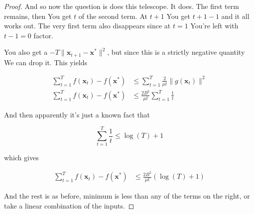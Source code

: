 \documentclass{article}
\begin{document}
\begin{proof}
			And so now the question is does this telescope. It does. The first term remains, then You get $t$ of the second term. At $t+1$ You get $t+1-1$ and it all works out. The very first term also disappears since at $t=1$ You're left with $t-1=0$ factor. 
			
			You also get a $-T\|\mathbf{x}_{t+1} - \mathbf{x}^* \|^2$, but since this is a strictly negative quantity We can drop it. This yields 
			
			\begin{align*}
				\sum ^T_{t=1} f(\mathbf{x}_t) - f(\mathbf{x}^*)  &\le \sum^T_{t=1}  \frac{2}{\mu t}\| g(\mathbf{x}_t) \|^2 \\
				\sum ^T_{t=1} f(\mathbf{x}_t) - f(\mathbf{x}^*)  &\le \frac{2B^2}{\mu t}\sum^T_{t=1}  \frac{1}{ t}
			\end{align*}
			
			And then apparently it's just a known fact that 
			
			\[ \sum^T_{t=1} \frac{1}{t} \le \log(T)+1 \]
			
			which gives 
			
			\begin{align*}
				\sum ^T_{t=1} f(\mathbf{x}_t) - f(\mathbf{x}^*)  &\le \frac{2B^2}{\mu t}(\log(T)+1)
			\end{align*}
			
			And the rest is as before, minimum is less than any of the terms on the right, or take a linear combination of the inputs.
			
		\end{proof}
		

		
		
		
\end{document}
